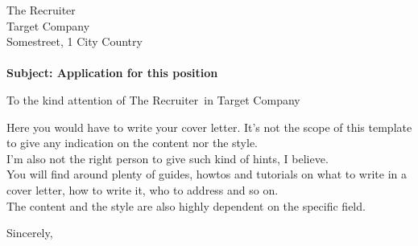 \documentclass[a4paper]{letter}
\def\company{Target Company}
\def\recruiter{The Recruiter}
\def\companyaddress{Somestreet, 1 \newline 0000 City \newline Country}
\def\lettersubject{Subject: Application for this position}
\begin{document}
  \begin{letter}{\recruiter \\ \company \\ \companyaddress \\ ~ \\ \textbf{\lettersubject}}

  \opening{To the kind attention of \recruiter ~in \company}

  Here you would have to write your cover letter. It's not the scope of this template to give any indication on the content nor the style.\\
  I'm also not the right person to give such kind of hints, I believe.\\
  You will find around plenty of guides, howtos and tutorials on what to write in a cover letter, how to write it, who to address and so on.\\
  The content and the style are also highly dependent on the specific field.\\

  \closing{Sincerely,}

  \end{letter}
\end{document}
